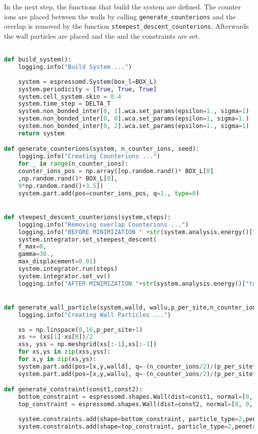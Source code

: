 In the next step, the functions that build the system are defined. The counter ions are placed between the walls by calling \texttt{generate\_counterions} and the overlap  is removed by the function \texttt{steepest\_descent\_counterions}. Afterwards the wall particles are placed and the and the constraints are set.
\begin{lstlisting}[language=python]

def build_system():
	logging.info("Build System ...")
	
	system = espressomd.System(box_l=BOX_L)
	system.periodicity = [True, True, True]
	system.cell_system.skin = 0.4
	system.time_step = DELTA_T
	system.non_bonded_inter[0, 1].wca.set_params(epsilon=1., sigma=1)
	system.non_bonded_inter[0, 0].wca.set_params(epsilon=1, sigma=1.)
	system.non_bonded_inter[0, 2].wca.set_params(epsilon=1., sigma=1)
	return system

def generate_counterions(system, n_counter_ions, seed):
	logging.info("Creating Counterions ...")
	for _ in range(n_counter_ions):
	counter_ions_pos = np.array([np.random.rand()* BOX_L[0]
	,np.random.rand()* BOX_L[0],
	9*np.random.rand()+3.5])
	system.part.add(pos=counter_ions_pos, q=1., type=0)


def steepest_descent_counterions(system,steps):
	logging.info("Removing overlap Counterions ...")
	logging.info("BEFORE MINIMIZATION " +str(system.analysis.energy()["total"]))
	system.integrator.set_steepest_descent(
	f_max=0,
	gamma=30.,
	max_displacement=0.01)
	system.integrator.run(steps)
	system.integrator.set_vv()
	logging.info("AFTER MINIMIZATION "+str(system.analysis.energy()["total"]))


def generate_wall_particle(system,walld, wallu,p_per_site,n_counter_ions):
	logging.info("Creating Wall Particles ...")
	
	xs = np.linspace(0,16,p_per_site+1)
	xs += (xs[1]-xs[0])/2
	xss, yss = np.meshgrid(xs[:-1],xs[:-1])
	for xs,ys in zip(xss,yss):
	for x,y in zip(xs,ys):
	system.part.add(pos=[x,y,walld], q=-(n_counter_ions/2)/(p_per_site**2), type=1,fix =[True,True,True])
	system.part.add(pos=[x,y,wallu], q=-(n_counter_ions/2)/(p_per_site**2), type=1, fix =[True,True,True])

def generate_constraint(const1,const2):
	bottom_constraint = espressomd.shapes.Wall(dist=const1, normal=[0, 0, 1])
	top_constraint = espressomd.shapes.Wall(dist=const2, normal=[0, 0, -1])
	
	system.constraints.add(shape=bottom_constraint, particle_type=2,penetrable=False)
	system.constraints.add(shape=top_constraint, particle_type=2,penetrable=False)
	

\end{lstlisting}
